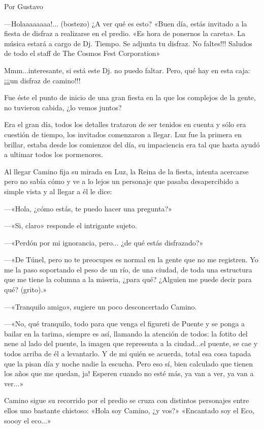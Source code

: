 \documentclass[11pt,twoside,openright,a5paper]{book}
\begin{document}
\begin{flushright}Por Gustavo\end{flushright}

---Holaaaaaaaa!... (bostezo) ¿A ver qué es esto?  «Buen día, estás invitado a la fiesta de disfraz a realizarse en el predio. «Es hora de ponernos la careta». La música estará a cargo de Dj. Tiempo. Se adjunta tu disfraz. No faltes!!!  Saludos de todo el staff de The Cosmos Fest Corporation»

Mmm...interesante, si está este Dj. no puedo faltar. Pero, qué hay en esta caja: ¡¡¡un disfraz de camino!!! 

Fue éste el punto de inicio de una gran fiesta en la que los complejos de la gente, no tuvieron cabida, ¿lo vemos juntos?

Era el gran día, todos los detalles trataron de ser tenidos en cuenta y sólo era cuestión de tiempo, los invitados comenzaron a llegar. Luz fue la primera en brillar, estaba desde los comienzos del día, su impaciencia era tal que hasta ayudó a ultimar todos los pormenores.

Al llegar Camino fija su mirada en Luz, la Reina de la fiesta, intenta acercarse pero no sabía cómo y ve a lo lejos un personaje que pasaba desapercibido a simple vista y al llegar a él le dice: 

---«Hola, ¿cómo estás, te puedo hacer una pregunta?»

---«Si, claro» responde el intrigante sujeto. 

---«Perdón por mi ignorancia, pero... ¿de qué estás disfrazado?»

---«De Túnel, pero no te preocupes es normal en la gente que no me registren. Yo me la paso soportando el peso de un río, de una ciudad, de toda una estructura que me tiene la columna a la miseria, ¿para qué? ¿Alguien me puede decir para qué? (grito).»

---«Tranquilo amigo», sugiere un poco desconcertado Camino.

---«No, qué tranquilo, todo para que venga el figureti de Puente y se ponga a bailar en la tarima, siempre es así, llamando la atención de todos: la fotito del nene al lado del puente, la imagen que representa a la ciudad...el puente, se cae y todos arriba de él a levantarlo. Y de mi quién se acuerda, total esa cosa tapada que la pisan día y noche nadie la escucha. Pero eso sí, bien calculado que tienen los años que me quedan, ja! Esperen cuando no esté más, ya van a ver, ya van a ver...»

Camino sigue su recorrido por el predio se cruza con distintos personajes entre ellos uno bastante chistoso: «Hola soy Camino, ¿y vos?»  «Encantado soy el Eco, soooy el eco...»
\end{document}
